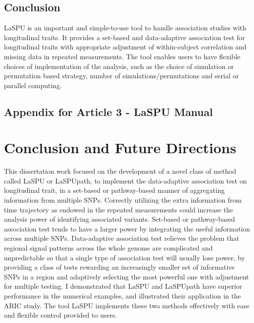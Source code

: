 \documentclass[12pt]{article}
\begin{document}
\subsection{Conclusion}
LaSPU is an important and simple-to-use tool to handle association studies with longitudinal traits. It provides a set-based and data-adaptive association test for longitudinal traits with appropriate adjustment of within-subject correlation and missing data in repeated measurements. The tool enables users to have flexible choices of implementation of the analysis, such as the choice of simulation or permutation based strategy, number of simulations/permutations and serial or parallel computing.  

\subsection{Appendix for Article 3 - LaSPU Manual}


\section{Conclusion and Future Directions}
\pagebreak
This dissertation work focused on the development of a novel class of method called LaSPU or LaSPUpath, to implement the data-adaptive association test on longitudinal trait, in a set-based or pathway-based manner of aggregating information from multiple SNPs. Correctly utilizing the extra information from time trajectory as endowed in the repeated measurements could increase the analysis power of identifying associated variants. Set-based or pathway-based association test tends to have a larger power by integrating the useful information across multiple SNPs. Data-adaptive association test relieves the problem that regional signal patterns across the whole genome are complicated and unpredictable so that a single type of association test will usually lose power, by providing a class of tests rewarding an increasingly smaller set of informative SNPs in a region and adaptively selecting the most powerful one with adjustment for multiple testing. I demonstrated that LaSPU and LaSPUpath have superior performance in the numerical examples, and illustrated their application in the ARIC study. The tool LaSPU implements these two methods effectively with ease and flexible control provided to users. 
\end{document}
